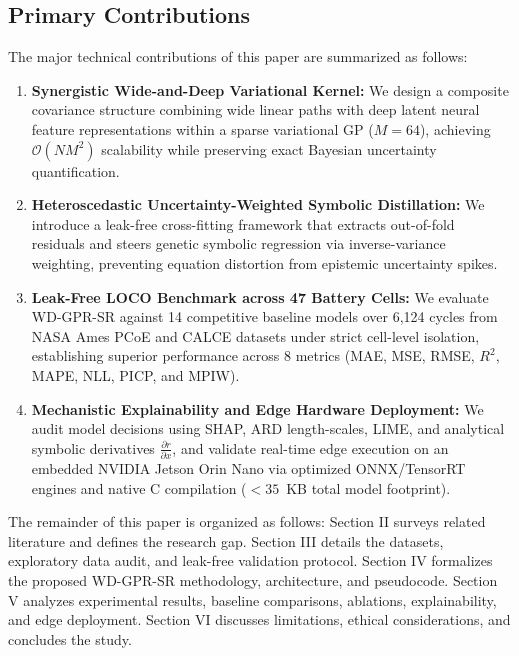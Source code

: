 \documentclass[a4paper,fleqn]{cas-sc}
\begin{document}
\subsection{Primary Contributions}
The major technical contributions of this paper are summarized as follows:
\begin{enumerate}
    \item \textbf{Synergistic Wide-and-Deep Variational Kernel:} We design a composite covariance structure combining wide linear paths with deep latent neural feature representations within a sparse variational GP ($M=64$), achieving $\mathcal{O}(NM^2)$ scalability while preserving exact Bayesian uncertainty quantification.
    \item \textbf{Heteroscedastic Uncertainty-Weighted Symbolic Distillation:} We introduce a leak-free cross-fitting framework that extracts out-of-fold residuals and steers genetic symbolic regression via inverse-variance weighting, preventing equation distortion from epistemic uncertainty spikes.
    \item \textbf{Leak-Free LOCO Benchmark across 47 Battery Cells:} We evaluate WD-GPR-SR against 14 competitive baseline models over 6,124 cycles from NASA Ames PCoE and CALCE datasets under strict cell-level isolation, establishing superior performance across 8 metrics (MAE, MSE, RMSE, $R^2$, MAPE, NLL, PICP, and MPIW).
    \item \textbf{Mechanistic Explainability and Edge Hardware Deployment:} We audit model decisions using SHAP, ARD length-scales, LIME, and analytical symbolic derivatives $\frac{\partial r}{\partial x}$, and validate real-time edge execution on an embedded NVIDIA Jetson Orin Nano via optimized ONNX/TensorRT engines and native C compilation ($<35$~KB total model footprint).
\end{enumerate}

The remainder of this paper is organized as follows: Section II surveys related literature and defines the research gap. Section III details the datasets, exploratory data audit, and leak-free validation protocol. Section IV formalizes the proposed WD-GPR-SR methodology, architecture, and pseudocode. Section V analyzes experimental results, baseline comparisons, ablations, explainability, and edge deployment. Section VI discusses limitations, ethical considerations, and concludes the study.
\end{document}
